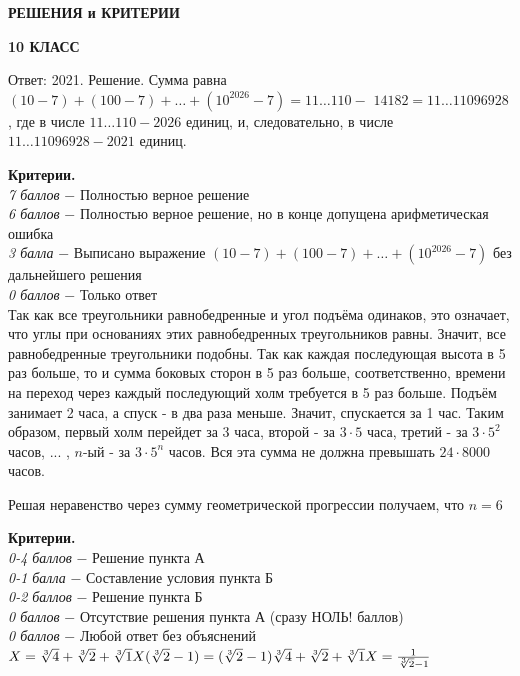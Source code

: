 \centerline{\bf \Large  РЕШЕНИЯ и КРИТЕРИИ}

\centerline{\bf \Large  10 КЛАСС}

Ответ: 2021. Решение. Сумма равна $(10-7)+(100-7)+\ldots+\left(10^{2026}-7\right)=11 \ldots 110-$ $14182=11 \ldots 11096928$, где в числе $11 \ldots 110-2026$ единиц, и, следовательно, в числе $11 \ldots 11096928-2021$ единиц.

\textbf{Критерии.} \\
\textit{7 баллов} $-$ Полностью верное решение\\
\textit{6 баллов} $-$ Полностью верное решение, но в конце допущена арифметическая ошибка\\
\textit{3 балла} $-$ Выписано выражение $(10-7)+(100-7)+\ldots+\left(10^{2026}-7\right)$ без дальнейшего решения\\
\textit{0 баллов} $-$  Только ответ\\ 


 Так как все треугольники равнобедренные и угол подъёма одинаков, это означает, что углы при основаниях этих равнобедренных треугольников равны. Значит, все равнобедренные треугольники подобны. Так как каждая последующая высота в 5 раз больше, то и сумма боковых сторон в 5 раз больше, соответственно, времени на переход через каждый последующий холм требуется в 5 раз больше. Подъём занимает 2 часа, а спуск - в два раза меньше. Значит, спускается за 1 час. Таким образом, первый холм перейдет за 3 часа, второй - за $3\cdot5$ часа, третий - за $3\cdot5^2$ часов, ... , $n$-ый - за $3\cdot5^n$ часов. Вся эта сумма не должна превышать $24\cdot8000$ часов.

Решая неравенство через сумму геометрической прогрессии получаем, что $n=6$\par

\textbf{Критерии.} \\
\textit{0-4 баллов} $-$ Решение пункта А\\
\textit{0-1 балла} $-$ Составление условия пункта Б \\
\textit{0-2 баллов} $-$ Решение пункта Б\\
\textit{0 баллов} $-$ Отсутствие решения пункта А (сразу НОЛЬ! баллов)\\
\textit{0 баллов} $-$ Любой ответ без объяснений\\

$X=\sqrt[3]{4}+\sqrt[3]{2}+\sqrt[3]{1} \\ X(\sqrt[3]{2}-1)=(\sqrt[3]{2}-1) \sqrt[3]{4}+\sqrt[3]{2}+\sqrt[3]{1} \\ X=\frac{1}{\sqrt[3]{2}-1}$


